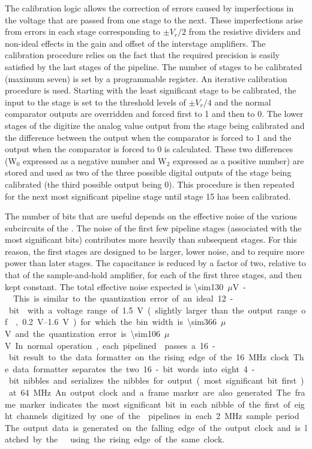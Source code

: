 The calibration logic allows the correction of errors caused by imperfections
in the voltage that are passed from one stage to the next.  These imperfections
arise from errors in each stage corresponding to $\pm V_r/2$ from the resistive
dividers and non-ideal effects in the gain and offset of the interstage amplifiers.
The calibration procedure relies on the fact that the required precision is easily
satisfied by the last stages of the pipeline.
The number of stages to be calibrated (maximum seven) is set by a programmable
register.  An iterative calibration procedure is used.  Starting with the least
significant stage to be calibrated, the input to the stage is set to the threshold
levels of $\pm V_r/4$ and the normal comparator outputs are overridden
and forced first to \num{1} and then to \num{0}.  The lower stages of the  digitize
the analog value output from the stage being calibrated and the difference between
the  output when the comparator is forced to \num{1} and the 
output when the comparator is forced to \num{0} is calculated.  These two differences
(W$_0$ expressed as a negative number and W$_2$ expressed as a positive number) are
stored and used as two of the three possible digital outputs of the stage being
calibrated (the third possible output being \num{0}).  This procedure is then repeated
for the next most significant pipeline stage until stage \num{15} has been calibrated.

The number of  bits that are useful depends on the effective
noise of the various subcircuits of the .  The noise of the first few
pipeline stages (associated with the most significant bits) contributes more
heavily than subsequent stages.  For this reason, the first stages are designed
to be larger, lower noise, and to require more power than later stages. The capacitance
is reduced by a factor of two, relative to that of the sample-and-hold amplifier, for each
of the first three stages, and then kept constant. The total
effective noise expected is \SI{\sim130}{$\mu$V}-.  This is similar to the
quantization error of an ideal \num{12}-bit  with a voltage range of
\SI{1.5}{V} (slightly larger than the output range of , \SIrange{0.2}{1.6}{V})
for which the bin width is \SI{\sim366}{$\mu$V} and the quantization
error is \SI{\sim106}{$\mu$V}.

In normal operation, each pipelined  passes a \num{16}-bit result to the
data formatter on the rising edge of the \SI{16}{MHz} clock.  The data formatter
separates the two \num{16}-bit words into eight \num{4}-bit nibbles and serializes the
nibbles for output (most significant bit first) at \SI{64}{MHz}.   An output
clock and a frame marker are also generated.  The frame marker indicates the most
significant bit in each nibble of the first of eight channels digitized by one
of the  pipelines in each \SI{2}{MHz} sample period.  The output data
is generated on the falling edge of the output clock and is latched by the
  using the rising edge of the same clock.  

